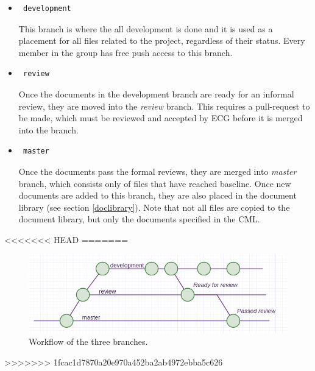 \documentclass{article}
\begin{document}
            \begin{itemize}
                \item \begin{verbatim} development \end{verbatim}
                This branch is where the all development is done and it is used as a placement for all files related
                to the project, regardless of their status.
                Every member in the group has free push access to this branch.
                
                \item \begin{verbatim} review \end{verbatim}
                Once the documents in the development branch are ready for an informal review,  they are moved
                into the \textit{review} branch. This requires a pull-request to be made, which must be reviewed and accepted by ECG before it is merged into the branch. 
                
                \item \begin{verbatim} master \end{verbatim}
                Once the documents pass the formal reviews, they are merged into 
                \textit{master} branch, which consists only of files that have reached baseline.
                Once new documents are added to this branch, they are also placed in the document library (see section \ref{doclibrary}).
                Note that not all files are copied to the document library, but only the documents specified in the CML.
                
            \end{itemize}
<<<<<<< HEAD
=======
            
            \begin{figure}[h]
                \centering
                \includegraphics[width=\textwidth]{images/workflow.png}
                \caption{Workflow of the three branches.}
                \label{workflow}
            \end{figure}
>>>>>>> 1fcac1d7870a20e970a452ba2ab4972ebba5c626
        
\end{document}

